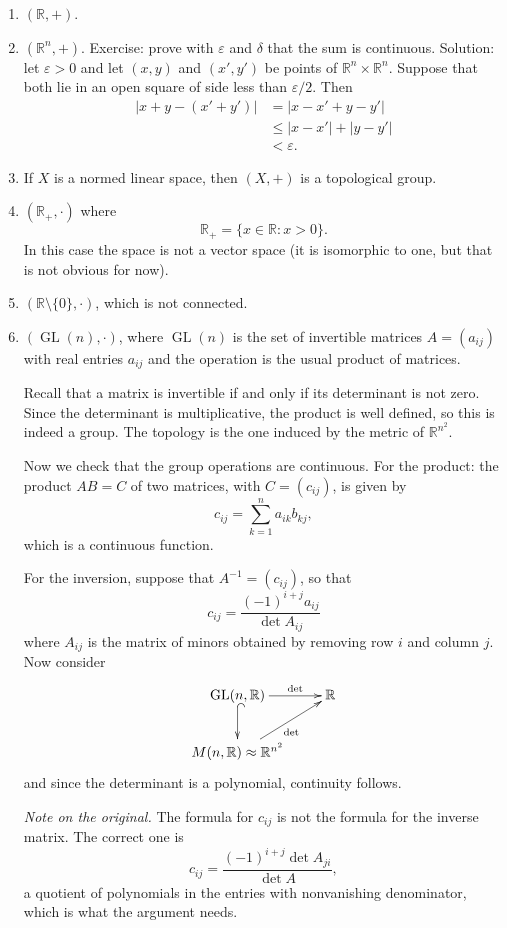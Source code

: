 \begin{example}
\label{example-first-topological-groups}
\begin{enumerate}
\item $(\mathbb{R},+)$.
\item $(\mathbb{R}^n,+)$. Exercise: prove
with $\varepsilon$ and $\delta$ that the
sum is continuous. Solution: let
$\varepsilon>0$ and let $(x,y)$ and
$(x',y')$ be points of
$\mathbb{R}^n\times\mathbb{R}^n$.
Suppose that both lie in an open square
of side less than $\varepsilon/2$. Then
$$
\begin{aligned}
|x+y-(x'+y')|
&=|x-x'+y-y'| \\
&\leq|x-x'|+|y-y'| \\
&<\varepsilon.
\end{aligned}
$$
\item If $X$ is a normed linear space,
then $(X,+)$ is a topological group.
\item $(\mathbb{R}_+,\cdot)$ where
$$
\mathbb{R}_+
=\{x\in\mathbb{R}:x>0\}.
$$
In this case the space is not a vector
space (it is isomorphic to one, but
that is not obvious for now).
\item
$(\mathbb{R}\setminus\{0\},\cdot)$,
which is not connected.
\item $(\operatorname{GL}(n),\cdot)$,
where $\operatorname{GL}(n)$ is the set
of invertible matrices $A=(a_{ij})$ with
real entries $a_{ij}$ and the operation
is the usual product of matrices.

Recall that a matrix is invertible if
and only if its determinant is not zero.
Since the determinant is multiplicative,
the product is well defined, so this is
indeed a group. The topology is the one
induced by the metric of
$\mathbb{R}^{n^2}$.

Now we check that the group operations
are continuous. For the product: the
product $AB=C$ of two matrices, with
$C=(c_{ij})$, is given by
$$
c_{ij}=\sum_{k=1}^na_{ik}b_{kj},
$$
which is a continuous function.

For the inversion, suppose that
$A^{-1}=(c_{ij})$, so that
$$
c_{ij}
=\frac{(-1)^{i+j}a_{ij}}{\det A_{ij}}
$$
where $A_{ij}$ is the matrix of minors
obtained by removing row $i$ and
column $j$. Now consider
$$
\xymatrix{
\operatorname{GL}(n,\mathbb{R})
  \ar@{^{(}->}[d] \ar[r]^-{\det}
  & \mathbb{R} \\
M(n,\mathbb{R})
  \approx\mathbb{R}^{n^2}
  \ar[ur]_{\det}
}
$$
and since the determinant is a
polynomial, continuity follows.

{\it Note on the original.} The formula
for $c_{ij}$ is not the formula for the
inverse matrix. The correct one is
$$
c_{ij}
=\frac{(-1)^{i+j}\det A_{ji}}{\det A},
$$
a quotient of polynomials in the entries
with nonvanishing denominator, which is
what the argument needs.
\end{enumerate}
\end{example}

